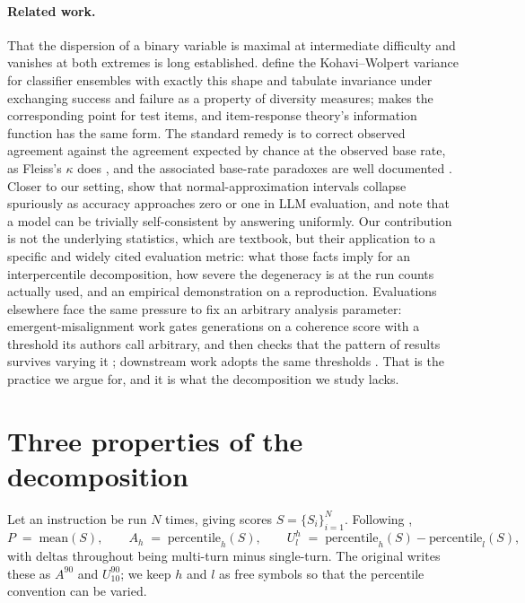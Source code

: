 \documentclass{article}
\begin{document}
\paragraph{Related work.} That the dispersion of a binary variable is maximal at intermediate
difficulty and vanishes at both extremes is long established. \citet{kuncheva2003diversity} define
the Kohavi--Wolpert variance for classifier ensembles with exactly this shape and tabulate
invariance under exchanging success and failure as a property of diversity measures;
\citet{gulliksen1945relation} makes the corresponding point for test items, and item-response
theory's information function has the same form. The standard remedy is to correct observed agreement against the agreement expected by chance at the observed base rate, as Fleiss's $\kappa$ does \citep{fleiss1971measuring}, and the associated base-rate paradoxes are well documented
\citep{feinstein1990high}. Closer to our setting, \citet{bowyer2025position} show that
normal-approximation intervals collapse spuriously as accuracy approaches zero or one in LLM
evaluation, and \citet{clark2023barda} note that a model can be trivially self-consistent by
answering uniformly. Our contribution is not the underlying statistics, which are textbook, but
their application to a specific and widely cited evaluation metric: what those facts imply for an
interpercentile decomposition, how severe the degeneracy is at the run counts actually used, and an
empirical demonstration on a reproduction. Evaluations elsewhere face the same pressure to fix an arbitrary analysis parameter: emergent-misalignment work gates generations on a coherence score with a threshold its authors call arbitrary, and then checks that the pattern of results survives varying it \citep{betley2025emergent}; downstream work adopts the same thresholds \citep{taylor2025school}. That is the practice we argue for, and it is what the decomposition we study lacks.

\section{Three properties of the decomposition}

Let an instruction be run $N$ times, giving scores $S = \{S_i\}_{i=1}^N$. Following
\citet{laban2025lost},
\begin{equation}
P \;=\; \mathrm{mean}(S), \qquad
A_h \;=\; \mathrm{percentile}_h(S), \qquad
U^h_l \;=\; \mathrm{percentile}_h(S) - \mathrm{percentile}_l(S) ,
\label{eq:defs}
\end{equation}
with deltas throughout being multi-turn minus single-turn. The original writes these as
$A^{90}$ and $U^{90}_{10}$; we keep $h$ and $l$ as free symbols so that the percentile
convention can be varied.
\end{document}
